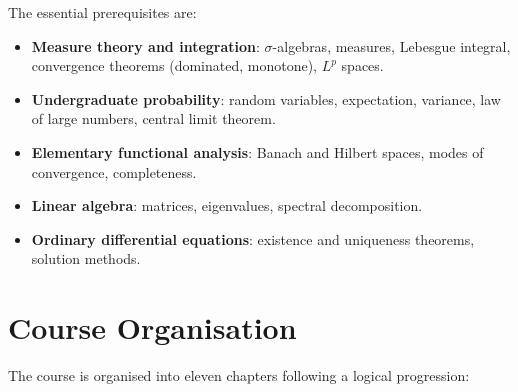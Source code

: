The essential prerequisites are:
\begin{itemize}
  \item \textbf{Measure theory and integration}: $\sigma$-algebras, measures,
    Lebesgue integral, convergence theorems (dominated, monotone), $L^p$ spaces.
  \item \textbf{Undergraduate probability}: random variables, expectation,
    variance, law of large numbers, central limit theorem.
  \item \textbf{Elementary functional analysis}: Banach and Hilbert spaces,
    modes of convergence, completeness.
  \item \textbf{Linear algebra}: matrices, eigenvalues, spectral decomposition.
  \item \textbf{Ordinary differential equations}: existence and uniqueness
    theorems, solution methods.
\end{itemize}

\section*{Course Organisation}

The course is organised into eleven chapters following a logical progression:

